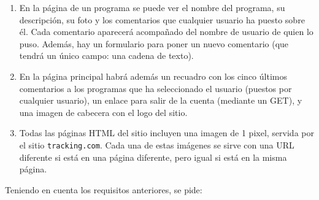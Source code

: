 \begin{enumerate}
\item En la página de un programa se puede ver el nombre del programa, su descripción, su foto y los comentarios que cualquier usuario ha puesto sobre él. Cada comentario aparecerá acompañado del nombre de usuario de quien lo puso. Además, hay un formulario para poner un nuevo comentario (que tendrá un único campo: una cadena de texto).
\item En la página principal habrá además un recuadro con los cinco últimos comentarios a los programas que ha seleccionado el usuario (puestos por cualquier usuario), un enlace para salir de la cuenta (mediante un GET), y una imagen de cabecera con el logo del sitio.
\item Todas las páginas HTML del sitio incluyen una imagen de 1 pixel, servida por el sitio \texttt{tracking.com}. Cada una de estas imágenes se sirve con una URL diferente si está en una página diferente, pero igual si está en la misma página.

\end{enumerate}

\newpage

Teniendo en cuenta los requisitos anteriores, se pide:

